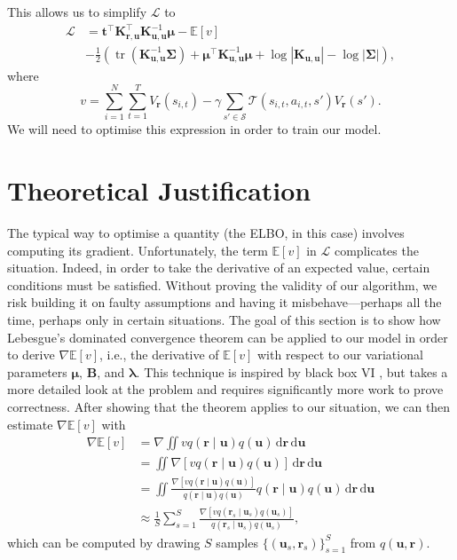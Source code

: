 \documentclass{mpaper}
\DeclareMathOperator{\tr}{tr}
\newcommand{\V}{V_{\mathbf{r}}}
\newcommand{\dx}{\,\mathrm{d}\mathbf{r}\,\mathrm{d}\mathbf{u}}
\newcommand{\Kuu}{\mathbf{K}_{\mathbf{u},\mathbf{u}}}
\newcommand{\Kru}{\mathbf{K}_{\mathbf{r},\mathbf{u}}}
\newcommand{\approximation}{q(\mathbf{u}, \mathbf{r})}
\begin{document}
This allows us to simplify $\mathcal{L}$ to
\begin{align*}
  \mathcal{L} &= \mathbf{t}^\intercal\Kru^\intercal\Kuu^{-1}\bm\mu - \mathbb{E}[v] \\
              &- \frac{1}{2} \left(\tr \left( \Kuu^{-1}\bm\Sigma \right) + \bm\mu^\intercal\Kuu^{-1}\bm\mu + \log |\Kuu| - \log |\bm\Sigma| \right),
\end{align*}
where
\[
  v = \sum_{i=1}^N \sum_{t=1}^T \V(s_{i,t}) - \gamma\sum_{s' \in \mathcal{S}}
  \mathcal{T}(s_{i,t}, a_{i,t}, s')\V(s').
\]
We will need to optimise this expression in order to train our model.

\section{Theoretical Justification} \label{sec:proof}

The typical way to optimise a quantity (the ELBO, in this case) involves
computing its gradient. Unfortunately, the term $\mathbb{E}[v]$ in $\mathcal{L}$
complicates the situation. Indeed, in order to take the derivative of an
expected value, certain conditions must be satisfied. Without proving the
validity of our algorithm, we risk building it on faulty assumptions and having
it misbehave---perhaps all the time, perhaps only in certain situations. The
goal of this section is to show how Lebesgue's dominated convergence theorem can
be applied to our model in order to derive $\nabla\mathbb{E}[v]$, i.e., the
derivative of $\mathbb{E}[v]$ with respect to our variational parameters
$\bm\mu$, $\mathbf{B}$, and $\bm\lambda$. This technique is inspired by black
box VI \cite{DBLP:conf/aistats/RanganathGB14}, but takes a more detailed look at
the problem and requires significantly more work to prove correctness. After
showing that the theorem applies to our situation, we can then estimate
$\nabla\mathbb{E}[v]$ with
\begin{align*}
  \nabla\mathbb{E}[v] &= \nabla \iint v q(\mathbf{r} \mid \mathbf{u}) q(\mathbf{u})\dx \\
                      &= \iint \nabla[v q(\mathbf{r} \mid \mathbf{u}) q(\mathbf{u})]\dx \\
                      &= \iint \frac{\nabla[v q(\mathbf{r} \mid \mathbf{u})q(\mathbf{u})]}{q(\mathbf{r} \mid \mathbf{u})q(\mathbf{u})} q(\mathbf{r} \mid \mathbf{u}) q(\mathbf{u})\dx \\
                      &\approx \frac{1}{S} \sum_{s=1}^S \frac{\nabla[v q(\mathbf{r}_s \mid \mathbf{u}_s)q(\mathbf{u}_s)]}{q(\mathbf{r}_s \mid \mathbf{u}_s)q(\mathbf{u}_s)},
\end{align*}
which can be computed by drawing $S$ samples $\{(\mathbf{u}_s,
\mathbf{r}_s)\}_{s=1}^S$ from $\approximation$.
\end{document}
